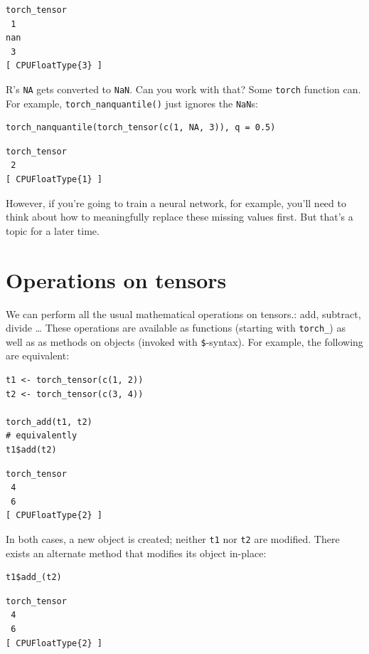 \documentclass[
  letterpaper,
]{krantz}
\begin{document}
\begin{verbatim}
torch_tensor
 1
nan
 3
[ CPUFloatType{3} ]
\end{verbatim}

R's \texttt{NA} gets converted to \texttt{NaN}. Can you work with that?
Some \texttt{torch} function can. For example,
\texttt{torch\_nanquantile()} just ignores the \texttt{NaN}s:

\begin{verbatim}
torch_nanquantile(torch_tensor(c(1, NA, 3)), q = 0.5)
\end{verbatim}

\begin{verbatim}
torch_tensor
 2
[ CPUFloatType{1} ]
\end{verbatim}

However, if you're going to train a neural network, for example, you'll
need to think about how to meaningfully replace these missing values
first. But that's a topic for a later time.

\hypertarget{operations-on-tensors}{%
\section{\texorpdfstring{Operations on
tensors}{Operations on tensors}}\label{operations-on-tensors}}

We can perform all the usual mathematical operations on tensors.: add,
subtract, divide \ldots{} These operations are available as functions
(starting with \texttt{torch\_}) as well as as methods on objects
(invoked with \texttt{\$}-syntax). For example, the following are
equivalent:

\begin{verbatim}
t1 <- torch_tensor(c(1, 2))
t2 <- torch_tensor(c(3, 4))

torch_add(t1, t2)
# equivalently
t1$add(t2)
\end{verbatim}

\begin{verbatim}
torch_tensor
 4
 6
[ CPUFloatType{2} ]
\end{verbatim}

In both cases, a new object is created; neither \texttt{t1} nor
\texttt{t2} are modified. There exists an alternate method that modifies
its object in-place:

\begin{verbatim}
t1$add_(t2)
\end{verbatim}

\begin{verbatim}
torch_tensor
 4
 6
[ CPUFloatType{2} ]
\end{verbatim}
\end{document}
